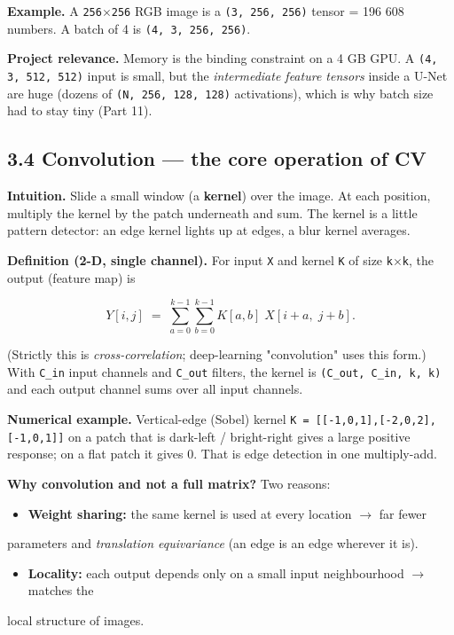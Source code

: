 \documentclass[11pt]{article}
\begin{document}
\textbf{Example.} A \texttt{256$\times$256} RGB image is a \texttt{(3, 256, 256)} tensor = 196 608 numbers. A batch of 4 is \texttt{(4, 3, 256, 256)}.

\textbf{Project relevance.} Memory is the binding constraint on a 4 GB GPU. A \texttt{(4, 3, 512, 512)} input is small, but the \textit{intermediate feature tensors} inside a U-Net are huge (dozens of \texttt{(N, 256, 128, 128)} activations), which is why batch size had to stay tiny (Part 11).

\subsection*{3.4 Convolution --- the core operation of CV}

\textbf{Intuition.} Slide a small window (a \textbf{kernel}) over the image. At each position, multiply the kernel by the patch underneath and sum. The kernel is a little pattern detector: an edge kernel lights up at edges, a blur kernel averages.

\textbf{Definition (2-D, single channel).} For input \texttt{X} and kernel \texttt{K} of size \texttt{k$\times$k}, the output (feature map) is

\[Y[i,j] \;=\; \sum_{a=0}^{k-1}\sum_{b=0}^{k-1} K[a,b]\; X[i+a,\; j+b].\]

(Strictly this is \textit{cross-correlation}; deep-learning "convolution" uses this form.) With \texttt{C\_in} input channels and \texttt{C\_out} filters, the kernel is \texttt{(C\_out, C\_in, k, k)} and each output channel sums over all input channels.

\textbf{Numerical example.} Vertical-edge (Sobel) kernel \texttt{K = [[-1,0,1],[-2,0,2],[-1,0,1]]} on a patch that is dark-left / bright-right gives a large positive response; on a flat patch it gives 0. That is edge detection in one multiply-add.

\textbf{Why convolution and not a full matrix?} Two reasons:
\begin{itemize}\setlength{\itemsep}{1pt}
\item \textbf{Weight sharing:} the same kernel is used at every location $\rightarrow$ far fewer
\end{itemize}
  parameters and \textit{translation equivariance} (an edge is an edge wherever it is).
\begin{itemize}\setlength{\itemsep}{1pt}
\item \textbf{Locality:} each output depends only on a small input neighbourhood $\rightarrow$ matches the
\end{itemize}
  local structure of images.
\end{document}
